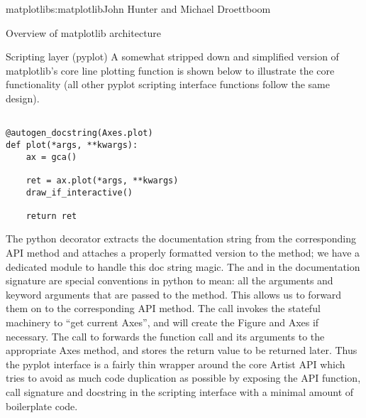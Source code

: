 \begin{aosachapter}{matplotlib}{s:matplotlib}{John Hunter and Michael Droettboom}
\begin{aosasect1}{Overview of matplotlib architecture}
\begin{aosasect2}{Scripting layer (pyplot)}
A somewhat stripped down and simplified version of matplotlib's core
line plotting function  is shown below to
illustrate the core functionality (all other pyplot scripting
interface functions follow the same design).


\begin{verbatim}

@autogen_docstring(Axes.plot)
def plot(*args, **kwargs):
    ax = gca()

    ret = ax.plot(*args, **kwargs)
    draw_if_interactive()

    return ret

\end{verbatim}

The python decorator  extracts
the documentation string from the corresponding API method and
attaches a properly formatted version to the 
method; we have a dedicated module  to
handle this doc string magic.  The  and  in
the documentation signature are special conventions in python to mean:
all the arguments and keyword arguments that are passed to the method.
This allows us to forward them on to the corresponding API method.
The call  invokes the stateful machinery to ``get
current Axes'', and will create the Figure and Axes if necessary.  The
call to  forwards the function
call and its arguments to the appropriate Axes method, and stores the
return value to be returned later.  Thus the pyplot interface is a
fairly thin wrapper around the core Artist API which tries to avoid as
much code duplication as possible by exposing the API function, call
signature and docstring in the scripting interface with a minimal
amount of boilerplate code.

\end{aosasect2}



\end{aosasect1}
\end{aosachapter}

